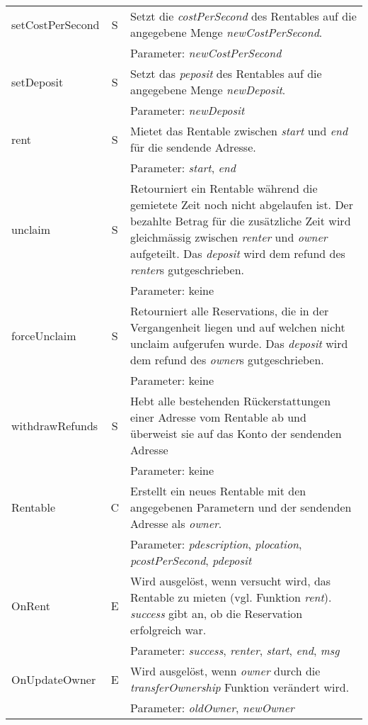 \begin{longtable}{@{}lcL{9cm}@{}}
setCostPerSecond   & S   & Setzt die \emph{costPerSecond} des Rentables auf die angegebene Menge \emph{newCostPerSecond}.\\ & & Parameter: \emph{newCostPerSecond} \\\midrule
setDeposit   & S   & Setzt das \emph{peposit} des Rentables auf die angegebene Menge \emph{newDeposit}.\\ & & Parameter: \emph{newDeposit} \\\midrule
rent                & S   & Mietet das Rentable zwischen \emph{start} und \emph{end} für die sendende Adresse.\\ & & Parameter: \emph{start}, \emph{end} \\\midrule
unclaim         & S   & Retourniert ein Rentable während die gemietete Zeit noch nicht abgelaufen ist. Der bezahlte Betrag für die zusätzliche Zeit wird gleichmässig zwischen \emph{renter} und \emph{owner} aufgeteilt. Das \emph{deposit} wird dem refund des \emph{renter}s gutgeschrieben.\\ & & Parameter: keine \\\midrule
forceUnclaim         & S   & Retourniert alle Reservations, die in der Vergangenheit liegen und auf welchen nicht unclaim aufgerufen wurde. Das \emph{deposit} wird dem refund des \emph{owner}s gutgeschrieben.\\ & & Parameter: keine \\\midrule
withdrawRefunds     & S   & Hebt alle bestehenden Rückerstattungen einer Adresse vom Rentable ab und überweist sie auf das Konto der sendenden Adresse\\ & & Parameter: keine \\\midrule
Rentable            & C   & Erstellt ein neues Rentable mit den angegebenen Parametern und der sendenden Adresse als \emph{owner}.\\ & & Parameter: \emph{pdescription}, \emph{plocation}, \emph{pcostPerSecond}, \emph{pdeposit} \\ \midrule
OnRent              & E   & Wird ausgelöst, wenn versucht wird, das Rentable zu mieten (vgl. Funktion \emph{rent}). \emph{success} gibt an, ob die Reservation erfolgreich war.\\ & & Parameter: \emph{success}, \emph{renter}, \emph{start}, \emph{end}, \emph{msg} \\ \midrule
OnUpdateOwner              & E   & Wird ausgelöst, wenn \emph{owner} durch die \emph{transferOwnership} Funktion verändert wird.\\ & & Parameter: \emph{oldOwner}, \emph{newOwner} \\ \midrule

\end{longtable}
